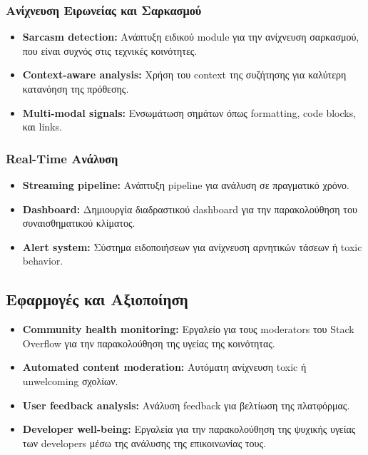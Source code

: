 \documentclass[a4paper,11pt,oneside,openany]{ioniothesis}
\begin{document}
\subsubsection{Ανίχνευση Ειρωνείας και Σαρκασμού}

\begin{itemize}
    \item \textbf{Sarcasm detection:} Ανάπτυξη ειδικού module για την ανίχνευση σαρκασμού, που είναι συχνός στις τεχνικές κοινότητες.
    
    \item \textbf{Context-aware analysis:} Χρήση του context της συζήτησης για καλύτερη κατανόηση της πρόθεσης.
    
    \item \textbf{Multi-modal signals:} Ενσωμάτωση σημάτων όπως formatting, code blocks, και links.
\end{itemize}

\subsubsection{Real-Time Ανάλυση}

\begin{itemize}
    \item \textbf{Streaming pipeline:} Ανάπτυξη pipeline για ανάλυση σε πραγματικό χρόνο.
    
    \item \textbf{Dashboard:} Δημιουργία διαδραστικού dashboard για την παρακολούθηση του συναισθηματικού κλίματος.
    
    \item \textbf{Alert system:} Σύστημα ειδοποιήσεων για ανίχνευση αρνητικών τάσεων ή toxic behavior.
\end{itemize}

\subsection{Εφαρμογές και Αξιοποίηση}
\label{sec:Εφαρμογές και Αξιοποίηση}

\begin{itemize}
    \item \textbf{Community health monitoring:} Εργαλείο για τους moderators του Stack Overflow για την παρακολούθηση της υγείας της κοινότητας.
    
    \item \textbf{Automated content moderation:} Αυτόματη ανίχνευση toxic ή unwelcoming σχολίων.
    
    \item \textbf{User feedback analysis:} Ανάλυση feedback για βελτίωση της πλατφόρμας.
    
    \item \textbf{Developer well-being:} Εργαλεία για την παρακολούθηση της ψυχικής υγείας των developers μέσω της ανάλυσης της επικοινωνίας τους.
\end{itemize}
\end{document}

